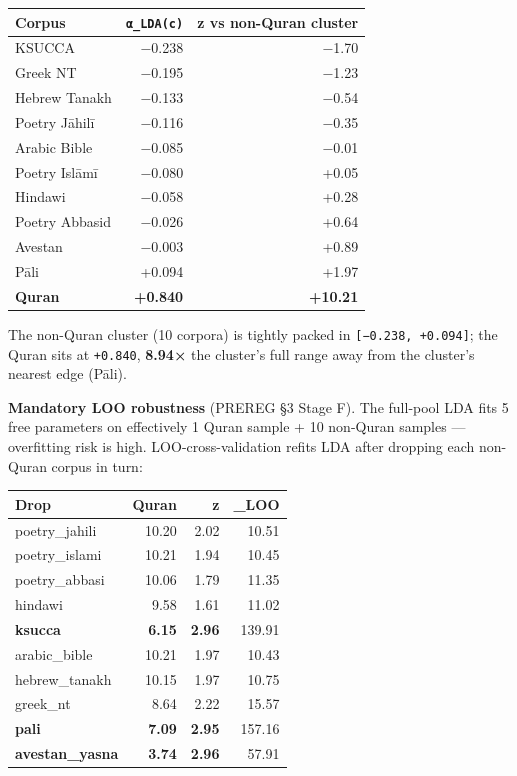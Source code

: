 \documentclass[
]{article}
\newcounter{none} %
\begin{document}
{\def\LTcaptype{none} %
\begin{longtable}[]{@{}lrr@{}}
\toprule\noalign{}
Corpus & \texttt{α\_LDA(c)} & z vs non-Quran cluster \\
\midrule\noalign{}
\endhead
\bottomrule\noalign{}
\endlastfoot
KSUCCA & −0.238 & −1.70 \\
Greek NT & −0.195 & −1.23 \\
Hebrew Tanakh & −0.133 & −0.54 \\
Poetry Jāhilī & −0.116 & −0.35 \\
Arabic Bible & −0.085 & −0.01 \\
Poetry Islāmī & −0.080 & +0.05 \\
Hindawi & −0.058 & +0.28 \\
Poetry Abbasid & −0.026 & +0.64 \\
Avestan & −0.003 & +0.89 \\
Pāli & +0.094 & +1.97 \\
\textbf{Quran} & \textbf{+0.840} & \textbf{+10.21} \\
\end{longtable}
}

The non-Quran cluster (10 corpora) is tightly packed in
\texttt{{[}−0.238,\ +0.094{]}}; the Quran sits at \texttt{+0.840},
\textbf{8.94×} the cluster's full range away from the cluster's nearest
edge (Pāli).

\textbf{Mandatory LOO robustness} (PREREG §3 Stage F). The full-pool LDA
fits 5 free parameters on effectively 1 Quran sample + 10 non-Quran
samples --- overfitting risk is high. LOO-cross-validation refits LDA
after dropping each non-Quran corpus in turn:

{\def\LTcaptype{none} %
\begin{longtable}[]{@{}lrrr@{}}
\toprule\noalign{}
Drop & Quran & z & \_LOO \\
\midrule\noalign{}
\endhead
\bottomrule\noalign{}
\endlastfoot
poetry\_jahili & 10.20 & 2.02 & 10.51 \\
poetry\_islami & 10.21 & 1.94 & 10.45 \\
poetry\_abbasi & 10.06 & 1.79 & 11.35 \\
hindawi & 9.58 & 1.61 & 11.02 \\
\textbf{ksucca} & \textbf{6.15} & \textbf{2.96} & 139.91 \\
arabic\_bible & 10.21 & 1.97 & 10.43 \\
hebrew\_tanakh & 10.15 & 1.97 & 10.75 \\
greek\_nt & 8.64 & 2.22 & 15.57 \\
\textbf{pali} & \textbf{7.09} & \textbf{2.95} & 157.16 \\
\textbf{avestan\_yasna} & \textbf{3.74} & \textbf{2.96} & 57.91 \\
\end{longtable}
}
\end{document}
